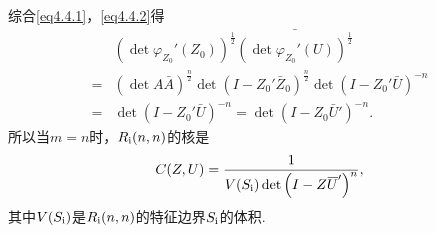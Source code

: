 综合\eqref{eq4.4.1}，\eqref{eq4.4.2}得
\begin{align*}
	&\left(\det\varphi_{Z_0}'(Z_0)\right)^{\frac12}\bar{\left(\det\varphi_{Z_0}'(U)\right)^{\frac12}}\\
	=&\left(\det A\bar{A}\right)^{\frac n2}\det\left(I-Z_0' \bar{Z}_0\right)^{\frac n2}\det\left(I-Z_0'\bar{U}\right)^{-n}\\
	=&\det\left(I-Z_0'\bar{U}\right)^{-n}=\det\left(I-Z_0\bar{U}'\right)^{-n}.
\end{align*}
所以当$m=n$时，$R_{\text{\uppercase\expandafter{\romannumeral1}}}(n,n)$的核是
\begin{equation}\label{eq4.4.3}
	C(Z,U)=\frac1{V(S_{\text{\uppercase\expandafter{\romannumeral1}}})\det\left(I-Z\bar{U}'\right)^n},
\end{equation}
其中$V(S_{\text{\uppercase\expandafter{\romannumeral1}}})$是$R_{\text{\uppercase\expandafter{\romannumeral1}}}(n,n)$的特征边界$S_{\text{\uppercase\expandafter{\romannumeral1}}}$的体积.

